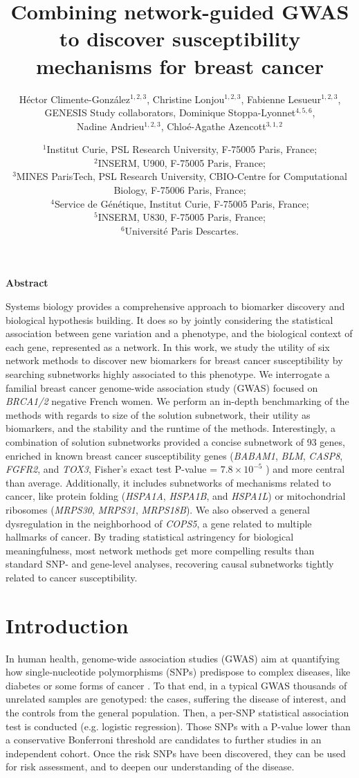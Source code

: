 \documentclass[twocolumn, 10pt]{article}
\title{Combining network-guided GWAS to discover susceptibility mechanisms for breast cancer}
\author{Héctor Climente-González$^{1,2,3}$, Christine Lonjou$^{1,2,3}$, Fabienne Lesueur$^{1,2,3}$,\\
GENESIS Study collaborators, Dominique Stoppa-Lyonnet$^{4,5,6}$,\\
Nadine Andrieu$^{1,2,3}$, Chloé-Agathe Azencott$^{3,1,2}$}
\date{$^{1}$Institut Curie, PSL Research University, F-75005 Paris, France;\\
  $^{2}$INSERM, U900, F-75005 Paris, France;\\
  $^{3}$MINES ParisTech, PSL Research University, CBIO-Centre for Computational Biology, F-75006 Paris, France;\\
  $^{4}$Service de Génétique, Institut Curie, F-75005 Paris, France;\\
  $^{5}$INSERM, U830, F-75005 Paris, France;\\
  $^{6}$Université Paris Descartes.\\
}
\begin{document}
\onecolumn
\maketitle

\Large\textbf{Abstract}

Systems biology provides a comprehensive approach to biomarker discovery and biological hypothesis building. It does so by jointly considering the statistical association between gene variation and a phenotype, and the biological context of each gene, represented as a network. In this work, we study the utility of six network methods to discover new biomarkers for breast cancer susceptibility by searching subnetworks highly associated to this phenotype. We interrogate a familial breast cancer genome-wide association study (GWAS) focused on \emph{BRCA1/2} negative French women. We perform an in-depth benchmarking of the methods with regards to size of the solution subnetwork, their utility as biomarkers, and the stability and the runtime of the methods. Interestingly, a combination of solution subnetworks provided a concise subnetwork of 93 genes, enriched in known breast cancer susceptibility genes (\emph{BABAM1}, \emph{BLM}, \emph{CASP8}, \emph{FGFR2}, and \emph{TOX3}, Fisher's exact test P-value = $7.8 \times 10^{-5}$ ) and more central than average. Additionally, it includes subnetworks of mechanisms related to cancer, like protein folding (\emph{HSPA1A}, \emph{HSPA1B}, and \emph{HSPA1L}) or mitochondrial ribosomes (\emph{MRPS30}, \emph{MRPS31}, \emph{MRPS18B}). We also observed a general dysregulation in the neighborhood of \emph{COPS5}, a gene related to multiple hallmarks of cancer. By trading statistical astringency for biological meaningfulness, most network methods get more compelling results than standard SNP- and gene-level analyses, recovering causal subnetworks tightly related to cancer susceptibility. 

\section{Introduction}

In human health, genome-wide association studies (GWAS) aim at quantifying how single-nucleotide polymorphisms (SNPs) predispose to complex diseases, like diabetes or some forms of cancer \cite{bush_chapter_2012}. To that end, in a typical GWAS thousands of unrelated samples are genotyped: the cases, suffering the disease of interest, and the controls from the general population. Then, a per-SNP statistical association test is conducted (e.g. logistic regression). Those SNPs with a P-value lower than a conservative Bonferroni threshold are candidates to further studies in an independent cohort. Once the risk SNPs have been discovered, they can be used for risk assessment, and to deepen our understanding of the disease.
\end{document}
